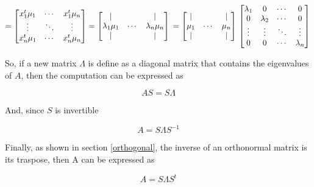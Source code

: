\documentclass{article}
\begin{document}
    \[
        =
        \begin{bmatrix}
            x_1^t \mu_1 & \cdots & x_1^t \mu_n\\
               \vdots   & \ddots &   \vdots   \\
            x_n^t \mu_1 & \cdots & x_n^t \mu_n\\
        \end{bmatrix}
        =
        \begin{bmatrix}
                    |       &        &         |      \\
            \lambda_1 \mu_1 & \cdots & \lambda_n \mu_n\\
                    |       &        &         |      \\
        \end{bmatrix}\\
        =
        \begin{bmatrix}
               |  &        &   |  \\
            \mu_1 & \cdots & \mu_n\\
               |  &        &   |  \\
        \end{bmatrix}\\
        \begin{bmatrix}
            \lambda_1 &      0    & \cdots &   0 \\
                0     & \lambda_2 & \cdots &   0 \\
              \vdots  &   \vdots  & \ddots & \vdots \\
                0     &      0    & \cdots & \lambda_n \\
        \end{bmatrix}\\
    \]

    So, if a new matrix $\Lambda$ is define as a diagonal matrix that contains
    the eigenvalues of $A$, then the computation can be expressed as

    \begin{equation*}
        A S = S \Lambda
    \end{equation*}

    And, since $S$ is invertible

    \begin{equation*}
        A = S \Lambda S^{-1}
    \end{equation*}

    Finally, as shown in section \ref{orthogonal}, the inverse of an orthonormal
    matrix is its traspose, then A can be expressed as

    \begin{equation*}
        A = S \Lambda S^t
    \end{equation*}
\end{document}
